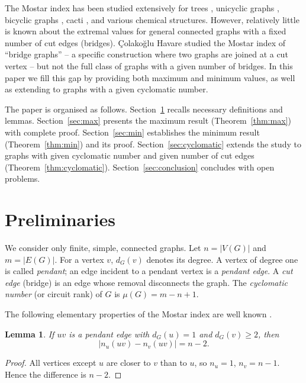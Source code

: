 \documentclass[12pt,a4paper]{article}
\newtheorem{lemma}[theorem]{Lemma}
\theoremstyle{definition}
\begin{document}
The Mostar index has been studied extensively for trees \cite{Tratnik2019, Ghorbani2019}, unicyclic graphs \cite{Deng2019, Liu2021}, bicyclic graphs \cite{Wang2020}, cacti \cite{Wang2022}, and various chemical structures. However, relatively little is known about the extremal values for general connected graphs with a fixed number of cut edges (bridges). Çolakoğlu Havare \cite{Colakoglu2021} studied the Mostar index of ``bridge graphs'' – a specific construction where two graphs are joined at a cut vertex – but not the full class of graphs with a given number of bridges. In this paper we fill this gap by providing both maximum and minimum values, as well as extending to graphs with a given cyclomatic number.

The paper is organised as follows. Section~\ref{sec:prelim} recalls necessary definitions and lemmas. Section~\ref{sec:max} presents the maximum result (Theorem~\ref{thm:max}) with complete proof. Section~\ref{sec:min} establishes the minimum result (Theorem~\ref{thm:min}) and its proof. Section~\ref{sec:cyclomatic} extends the study to graphs with given cyclomatic number and given number of cut edges (Theorem~\ref{thm:cyclomatic}). Section~\ref{sec:conclusion} concludes with open problems.

\section{Preliminaries}\label{sec:prelim}

We consider only finite, simple, connected graphs. Let \(n=|V(G)|\) and \(m=|E(G)|\). For a vertex \(v\), \(d_G(v)\) denotes its degree. A vertex of degree one is called \emph{pendant}; an edge incident to a pendant vertex is a \emph{pendant edge}. A \emph{cut edge} (bridge) is an edge whose removal disconnects the graph. The \emph{cyclomatic number} (or circuit rank) of \(G\) is \(\mu(G)=m-n+1\).

The following elementary properties of the Mostar index are well known \cite{Doslic2018}.

\begin{lemma}\label{lem:pendant}
If \(uv\) is a pendant edge with \(d_G(u)=1\) and \(d_G(v)\ge 2\), then
\[
|n_u(uv)-n_v(uv)| = n-2.
\]
\end{lemma}
\begin{proof}
All vertices except \(u\) are closer to \(v\) than to \(u\), so \(n_u=1\), \(n_v=n-1\). Hence the difference is \(n-2\).
\end{proof}
\end{document}
